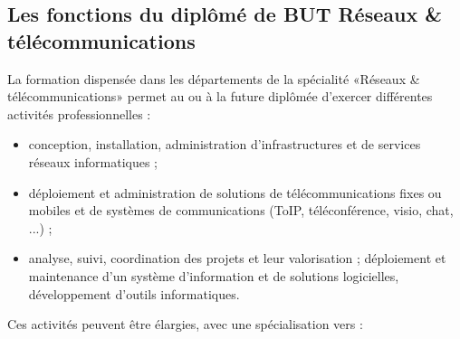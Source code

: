 \subsection*{Les fonctions du diplômé de BUT Réseaux \& télécommunications}
La formation dispensée dans les départements de la spécialité «Réseaux \& télécommunications» permet au ou à la future diplômée d'exercer différentes activités professionnelles :

\medskip
\begin{itemize}[leftmargin=5ex]
\item conception, installation, administration d'infrastructures et de services réseaux informatiques ;
\item déploiement et administration de  solutions de télécommunications fixes ou mobiles et de systèmes de communications (ToIP, téléconférence, visio, chat, ...) ;
\item analyse, suivi, coordination des projets et leur valorisation ;
déploiement et maintenance d'un système d'information et de solutions logicielles, développement d'outils informatiques.
\end{itemize}

\medskip
Ces activités peuvent être élargies, avec une  spécialisation vers : 

